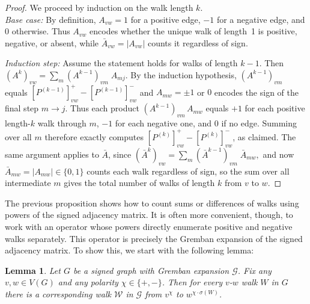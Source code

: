 \documentclass[reprint,onecolumn]{article}
\newtheorem{lemma}[theorem]{Lemma}
\newcommand{\mc}[1]{\mathcal{#1}}
\newcommand{\1}{\mathbb{1}}
\newcommand{\0}{\mathbf{0}}
\begin{document}
\begin{proof}
We proceed by induction on the walk length $k$. \\ \noindent\emph{Base case:}  By definition, \(A_{vw}=1\) for a positive edge, \(-1\) for a negative edge, and \(0\) otherwise. Thus \(A_{vw}\) encodes whether the unique walk of length~1 is positive, negative, or absent, while \(\bar A_{vw}=|A_{vw}|\) counts it regardless of sign.

\medskip

\noindent\emph{Induction step:}  Assume the statement holds for walks of length \(k-1\).  Then
\(
(A^k)_{vw}
=\sum_{m}(A^{k-1})_{vm}\;A_{m j}.
\)
By the induction hypothesis, \((A^{k-1})_{vm}\) equals
\(
[P^{(k-1)}]^+_{vw}
-
[P^{(k-1)}]^-_{vw}\)
and \(A_{mw}=\pm1\) or \(0\) encodes the sign of the final step \(m\to j\).  Thus each product
\((A^{k-1})_{vm}\,A_{mw}\)
equals \(+1\) for each positive length-\(k\) walk through \(m\), \(-1\) for each negative one, and \(0\) if no edge.  Summing over all \(m\) therefore exactly computes
\([P^{(k)}]^+_{vw}
-
[P^{(k)}]^-_{vw}\), as claimed.  
The same argument applies to \(\bar A\), since
\(
(\bar A^k)_{vw}
=\sum_{m}(\bar A^{k-1})_{vm}\;\bar A_{mw},
\)
and now \(\bar A_{mw}=|A_{mw}|\in\{0,1\}\) counts each walk regardless of sign, so the sum over all intermediate \(m\) gives the total number of walks of length \(k\) from \(v\) to \(w\).
\end{proof}
The previous proposition shows how to count sums or differences of walks using powers of the signed adjacency matrix. It is often more convenient, though, to work with an operator whose powers directly enumerate positive and negative walks separately. This operator is precisely the Gremban expansion of the signed adjacency matrix. To show this, we start with the following lemma: 

\begin{lemma}
    \label{lem:paths_expanded_graph}
Let $G$ be a signed graph with Gremban expansion $\mc G$. Fix any $v,w\in V(G)$ and any polarity $\chi\in\{+,-\}$.  Then for every $v$-$w$ walk $W$ in $G$ there is a corresponding walk $\mc W$ in $\mc G$ from $v^{\chi}$ to $w^{\chi \cdot \sigma(W)}$.
\end{lemma}
\end{document}
